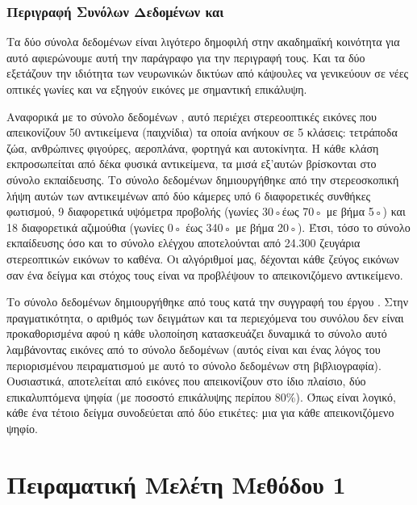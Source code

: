    \subsubsection{Περιγραφή Συνόλων Δεδομένων  και }
    Τα δύο σύνολα δεδομένων είναι λιγότερο δημοφιλή στην ακαδημαϊκή κοινότητα για αυτό αφιερώνουμε αυτή την παράγραφο για την περιγραφή τους. Και τα δύο εξετάζουν την ιδιότητα των νευρωνικών δικτύων από κάψουλες να γενικεύουν σε νέες οπτικές γωνίες και να εξηγούν εικόνες με σημαντική επικάλυψη.\par

    Αναφορικά με το σύνολο δεδομένων , αυτό περιέχει στερεο\textendash οπτικές εικόνες που απεικονίζουν 50 αντικείμενα (παιχνίδια) τα οποία ανήκουν σε 5 κλάσεις: τετράποδα ζώα, ανθρώπινες φιγούρες, αεροπλάνα, φορτηγά και αυτοκίνητα. Η κάθε κλάση εκπροσωπείται από δέκα φυσικά αντικείμενα, τα μισά εξ'αυτών βρίσκονται στο σύνολο εκπαίδευσης. Το σύνολο δεδομένων δημιουργήθηκε από την στερεοσκοπική λήψη αυτών των αντικειμένων από δύο κάμερες υπό 6 διαφορετικές συνθήκες φωτισμού, 9 διαφορετικά υψόμετρα προβολής (γωνίες 30◦έως 70◦ με βήμα 5◦) και 18 διαφορετικά αζιμούθια (γωνίες 0◦ έως 340◦ με βήμα 20◦). Έτσι, τόσο το σύνολο εκπαίδευσης όσο και το σύνολο ελέγχου αποτελούνται από 24.300 ζευγάρια στερεο\textendash πτικών εικόνων το καθένα. Οι αλγόριθμοί μας, δέχονται κάθε ζεύγος εικόνων σαν ένα δείγμα και στόχος τους είναι να προβλέψουν το απεικονιζόμενο αντικείμενο.\par

    Το σύνολο δεδομένων  δημιουργήθηκε από τους  κατά την συγγραφή του έργου \cite{sabour2017dynamic}. Στην πραγματικότητα, ο αριθμός των δειγμάτων και τα περιεχόμενα του συνόλου δεν είναι προκαθορισμένα αφού η κάθε υλοποίηση κατασκευάζει δυναμικά το σύνολο αυτό λαμβάνοντας εικόνες από το σύνολο δεδομένων  (αυτός είναι και ένας λόγος του περιορισμένου πειραματισμού με αυτό το σύνολο δεδομένων στη βιβλιογραφία). Ουσιαστικά, αποτελείται από εικόνες που απεικονίζουν στο ίδιο πλαίσιο, δύο επικαλυπτόμενα ψηφία (με ποσοστό επικάλυψης περίπου 80\%). Όπως είναι λογικό, κάθε ένα τέτοιο δείγμα συνοδεύεται από δύο ετικέτες: μια για κάθε απεικονιζόμενο ψηφίο.
    

\section{Πειραματική Μελέτη Μεθόδου 1}

